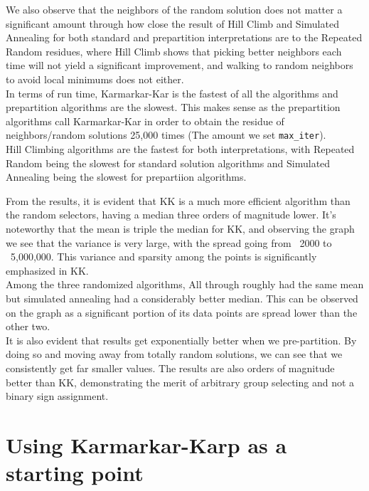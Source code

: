\documentclass[11pt]{scrartcl}
\theoremstyle{dotlessP}
\theoremstyle{dotlessN}
\theoremstyle{dotN}
\begin{document}
We also observe that the neighbors of the random solution does not matter a significant amount through how close the result of Hill Climb and Simulated Annealing for both standard and prepartition interpretations are to the Repeated Random residues, where Hill Climb shows that picking better neighbors each time will not yield a significant improvement, and walking to random neighbors to avoid local minimums does not either.
\\

In terms of run time, Karmarkar-Kar is the fastest of all the algorithms and prepartition algorithms are the slowest. This makes sense as the prepartition algorithms call Karmarkar-Kar in order to obtain the residue of neighbors/random solutions 25,000 times (The amount we set \texttt{max\_iter}). 
\\

Hill Climbing algorithms are the fastest for both interpretations, with Repeated Random being the slowest for standard solution algorithms and Simulated Annealing being the slowest for prepartiion algorithms.

From the results, it is evident that KK is a much more efficient algorithm than the random selectors, having a median three orders of magnitude lower. It's noteworthy that the mean is triple the median for KK, and observing the graph we see that the variance is very large, with the spread going from ~2000 to ~5,000,000. This variance and sparsity among the points is significantly emphasized in KK.\\

Among the three randomized algorithms, All through roughly had the same mean but simulated annealing had a considerably better median. This can be observed on the graph as a significant portion of its data points are spread lower than the other two.\\

It is also evident that results get exponentially better when we pre-partition. By doing so and moving away from totally random solutions, we can see that we consistently get far smaller values. The results are also orders of magnitude better than KK, demonstrating the merit of arbitrary group selecting and not a binary sign assignment.



\section{Using Karmarkar-Karp as a starting point}
\end{document}
